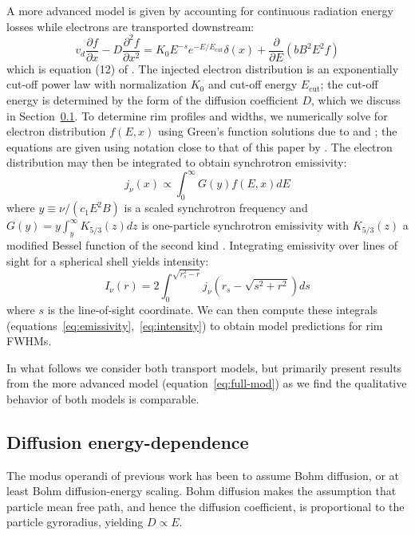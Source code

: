 \documentclass[iop, apj, numberedappendix, twocolappendix]{emulateapj}
\newcommand*{\mt}{\mathrm}
\newcommand*{\ptl}{\partial}
\newcommand*{\Ecut}{E_{\mt{cut}}}
\begin{document}
A more advanced model is given by accounting for continuous radiation energy
losses while electrons are transported downstream:
\begin{equation} \label{eq:full-mod}
    v_d \frac{\ptl f}{\ptl x} - D \frac{\ptl^2 f}{\ptl x^2} =
    K_0 E^{-s} e^{-E/\Ecut} \delta(x) + \frac{\ptl}{\ptl E}
      \left(bB^2E^2f\right)
\end{equation}
which is equation (12) of .  The injected electron
distribution is an exponentially cut-off power law with normalization $K_0$ and
cut-off energy $\Ecut$; the cut-off energy is determined by the form of the
diffusion coefficient $D$, which we discuss in
Section~\ref{sec:diffcoeff}.  To determine rim profiles and widths, we
numerically solve for electron distribution $f(E,x)$ using Green's function
solutions due to \citet{lerche1980} and \citet{rettig2012}; the equations are
given using notation close to that of this paper by .
The electron distribution may then be integrated to obtain synchrotron
emissivity:
\begin{equation} \label{eq:emissivity}
    j_{\nu}(x) \propto \int_0^\infty G(y) f(E,x) dE
\end{equation}
where $y \equiv \nu/(c_1 E^2 B)$ is a scaled synchrotron frequency and
$G(y) = y \int_y^\infty K_{5/3}(z) dz$ is one-particle synchrotron
emissivity with $K_{5/3}(z)$ a modified Bessel function of the second kind
\citep{pacholczyk1970}.  Integrating emissivity over lines of sight for a
spherical shell yields intensity:
\begin{equation} \label{eq:intensity}
    I_{\nu}(r) = 2 \int_0^{\sqrt{r_s^2 - r}}
                    j_{\nu} \left( r_s - \sqrt{s^2 + r^2} \right) ds
\end{equation}
where $s$ is the line-of-sight coordinate.  We can then compute these
integrals (equations~\eqref{eq:emissivity},~\eqref{eq:intensity}) to obtain
model predictions for rim FWHMs.

In what follows we consider both transport models, but primarily present
results from the more advanced model (equation~\eqref{eq:full-mod}) as we find
the qualitative behavior of both models is comparable.

\subsection{Diffusion energy-dependence} \label{sec:diffcoeff}

The modus operandi of previous work has been to assume Bohm diffusion, or at
least Bohm diffusion-energy scaling.  Bohm diffusion makes the
assumption that particle mean free path, and hence the diffusion coefficient,
is proportional to the particle gyroradius, yielding $D \propto E$.
\end{document}
